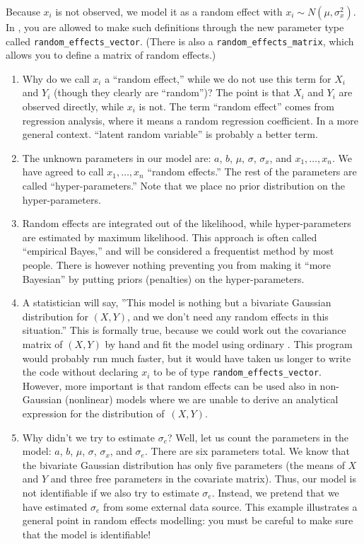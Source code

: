 \documentclass{admbmanual}
\begin{document}
Because $x_i$ is not observed, we model it as a random effect with $x_i\sim
N(\mu ,\sigma_{x}^{2})$. In \scAR, you are allowed to make such definitions
through the new parameter type called \texttt{random\_effects\_vector}.
 (There is also a \texttt{random\_effects\_matrix},
which allows you to define a matrix of random effects.)

\begin{enumerate}
\item Why do we call $x_i$ a ``random effect,'' while we do not use this term
for $X_i$ and $Y_i$ (though they clearly are ``random'')? The point is that $X_i$ and $Y_i$ are observed directly,
while $x_i$ is not. The term ``random effect'' comes from regression analysis, where it means a random regression
coefficient. In a more general context. ``latent random variable'' is probably a better term.

\item The unknown parameters in our model are: $a$, $b$, $\mu $, $\sigma $, $\sigma_{x}$, and $x_{1},\ldots ,x_{n}$.
We have agreed to call $x_{1},\ldots,x_{n}$ ``random effects.'' The rest of the parameters are called
``hyper-parameters.'' Note that we place no prior distribution on the hyper-parameters.

\item Random effects are integrated out of the likelihood, while
hyper-parameters are estimated by maximum likelihood.
This approach is often called
``empirical Bayes,'' and will be considered a frequentist method by most people. There is however nothing
preventing you from making it ``more Bayesian'' by putting priors (penalties) on the hyper-parameters.

\item A statistician will say, ''This model is nothing but a bivariate
Gaussian distribution for $(X,Y)$, and we don't need any random effects in
this situation.'' This is formally true, because we could work out the covariance
matrix of $(X,Y)$ by hand and fit the model using ordinary \scAB. This
program would probably run much faster, but it would have
taken us longer to write the code without declaring $x_i$ to be of type
\texttt{random\_effects\_vector}. However, more important is that random effects
can be used also in non-Gaussian (nonlinear) models where we are unable to
derive an analytical expression for the distribution of~$(X,Y)$.

\item Why didn't we try to estimate $\sigma_{e}$? Well, let us count the
parameters in the model: $a$, $b$, $\mu$, $\sigma$, $\sigma_{x}$, and $\sigma_{e}$. There are six parameters total. We
know that the bivariate Gaussian distribution has only five parameters (the means of $X$ and $Y$ and three free parameters in
the covariate matrix). Thus, our model is not identifiable if we also try to estimate $\sigma_{e}$. Instead, we
pretend that we have estimated $\sigma_{e}$ from some external data source. This example illustrates a general
point in random effects modelling: you must be careful to make sure that the model is identifiable!
\end{enumerate}
\end{document}
